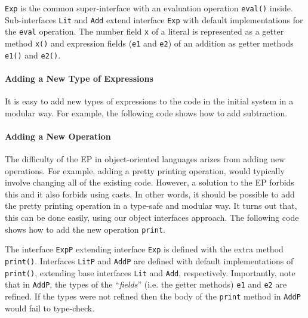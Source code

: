 
\noindent \texttt{Exp} is the common super-interface with an evaluation operation
\texttt{eval()} inside. Sub-interfaces \texttt{Lit} and \texttt{Add} extend
interface \texttt{Exp} with default implementations for the \texttt{eval}
operation. The number field \texttt{x} of a literal is represented as a getter
method \texttt{x()} and expression fields (\texttt{e1} and \texttt{e2}) of an addition as
getter methods \texttt{e1()} and \texttt{e2()}.

\paragraph{Adding a New Type of Expressions}
It is easy to add new types of expressions to the code in the initial system in a
modular way. For example, the following code shows how to add subtraction.



\paragraph{Adding a New Operation} The difficulty of the EP in object-oriented 
languages arizes from adding new operations. For example, adding a pretty printing 
operation, would typically involve changing all of the existing code. However, a solution 
to the EP forbids this and it also forbids using casts. In other words, it should be possible 
to add the pretty printing operation in a type-safe and modular way.  
It turns out that, this can be done easily, using our object interfaces approach. 
The following code shows how to add the new operation \texttt{print}.


\noindent  The interface \texttt{ExpP} extending interface \texttt{Exp} is defined with the
extra method \texttt{print()}. Interfaces \texttt{LitP} and \texttt{AddP} are
defined with default implementations of \texttt{print()}, extending
base interfaces \texttt{Lit} and \texttt{Add}, respectively. Importantly, note
that in \texttt{AddP}, the types of the ``\emph{fields}'' (i.e. the getter methods) \texttt{e1} 
and \texttt{e2} are refined. If the types were not refined then the body of the \texttt{print}
method in \texttt{AddP} would fail to type-check.

